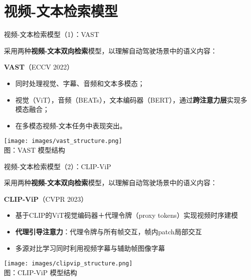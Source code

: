 \documentclass[serif]{beamer}
\begin{document}
\section{视频-文本检索模型}

\begin{frame}{视频-文本检索模型（1）：VAST}

采用两种\textbf{视频-文本双向检索}模型，以理解自动驾驶场景中的语义内容：

\vspace{0.2em}

\textbf{VAST}（ECCV 2022）  
\begin{itemize}
  \item 同时处理视觉、字幕、音频和文本多模态；
  \item 视觉（ViT），音频（BEATs），文本编码器（BERT），通过\textbf{跨注意力层}实现多模态融合；
  \item 在多模态视频-文本任务中表现突出。
\end{itemize}

\vspace{0.2em}
\centering
\texttt{[image: images/vast\_structure.png]}\\
{\footnotesize 图：VAST 模型结构}

\end{frame}


\begin{frame}{视频-文本检索模型（2）：CLIP-ViP}

采用两种\textbf{视频-文本双向检索}模型，以理解自动驾驶场景中的语义内容：

\vspace{0.2em}

\textbf{CLIP-ViP}（CVPR 2023）  
\begin{itemize}
  \item 基于CLIP的ViT视觉编码器＋代理令牌（proxy tokens）实现视频时序建模
  \item \textbf{代理引导注意力}：代理令牌与所有帧交互，帧内patch局部交互
  \item 多源对比学习同时利用视频字幕与辅助帧图像字幕
\end{itemize}

\vspace{0.2em}
\centering
\texttt{[image: images/clipvip\_structure.png]}\\
{\footnotesize 图：CLIP-ViP 模型结构}

\end{frame}
\end{document}
